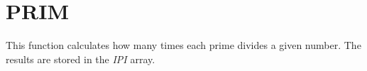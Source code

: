 \section{PRIM}
\label{sect:prim}

\noindent This function calculates how many times each prime divides a given
number. The results are stored in the {\em IPI} array.\\
